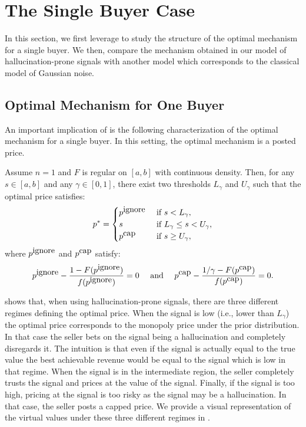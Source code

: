 \section{The Single Buyer Case}\label{sec:single-buyer}



In this section, we first leverage  to study the structure of the optimal mechanism for a single buyer. We then, compare the mechanism obtained in our model of hallucination-prone signals with another model which corresponds to the classical model of Gaussian noise.

\subsection{Optimal Mechanism for One Buyer}

An important implication of  is the following characterization of the optimal mechanism for a single buyer. In this setting, the optimal mechanism is a posted price. 

\begin{proposition}
\label{cor:optimal_price}
Assume $n = 1$ and $F$ is regular on $[a,b]$ with continuous density. Then, for any $s \in [a,b]$ and any $\gamma \in [0,1]$, there exist two thresholds $L_{\gamma}$ and $U_{\gamma}$ such that the optimal price satisfies:
\[ p^* = 
\begin{cases}
    p^{\hbox{ignore}} &\hbox{ if } s < L_{\gamma},\\
    s &\hbox{ if } L_{\gamma} \leq s < U_{\gamma},\\
    p^{\hbox{cap}}&\hbox{ if } s \geq U_{\gamma},
\end{cases}\]
where $p^{\hbox{ignore}}$ and $p^{\hbox{cap}}$ satisfy:
\[p^{\hbox{ignore}} - \frac{1 - F(p^{\hbox{ignore}})}{f(p^{\hbox{ignore}})} = 0 \quad \hbox{ and } \quad p^{\hbox{cap}} - \frac{1/\gamma - F(p^{\hbox{cap}})}{f(p^{\hbox{cap}})} = 0.\]
\end{proposition}


 shows that, when using hallucination-prone signals, there are three different regimes defining the optimal price. When the signal is low (i.e., lower than $L_\gamma$) the optimal price corresponds to the monopoly price under the prior distribution. In that case the seller bets on the signal being a hallucination and completely disregards it. The intuition is that even if the signal is actually equal to the true value the best achievable revenue would be equal to the signal which is low in that regime. When the signal is in the intermediate region, the seller completely trusts the signal and prices at the value of the signal. Finally, if the signal is too high, pricing at the signal is too risky as the signal may be a hallucination. In that case, the seller posts a capped price. We provide a visual representation of  the virtual values under these three different regimes in .


